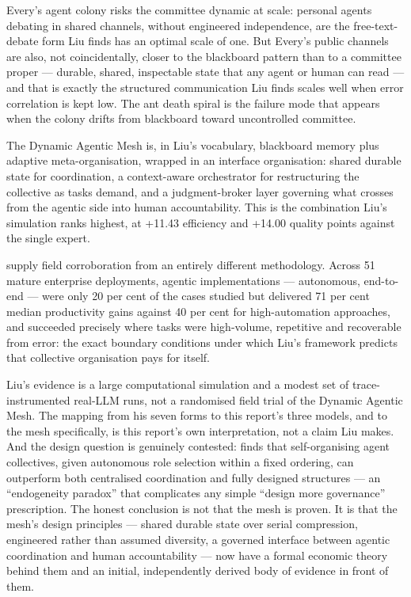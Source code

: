 Every's agent colony risks the committee dynamic at scale: personal agents debating in shared channels, without engineered independence, are the free-text-debate form Liu finds has an optimal scale of one. But Every's public channels are also, not coincidentally, closer to the blackboard pattern than to a committee proper --- durable, shared, inspectable state that any agent or human can read --- and that is exactly the structured communication Liu finds scales well when error correlation is kept low. The ant death spiral is the failure mode that appears when the colony drifts from blackboard toward uncontrolled committee.

The Dynamic Agentic Mesh is, in Liu's vocabulary, blackboard memory plus adaptive meta-organisation, wrapped in an interface organisation: shared durable state for coordination, a context-aware orchestrator for restructuring the collective as tasks demand, and a judgment-broker layer governing what crosses from the agentic side into human accountability. This is the combination Liu's simulation ranks highest, at +11.43 efficiency and +14.00 quality points against the single expert.

\textcite{Pereira2026Playbook} supply field corroboration from an entirely different methodology. Across 51 mature enterprise deployments, agentic implementations --- autonomous, end-to-end --- were only 20 per cent of the cases studied but delivered 71 per cent median productivity gains against 40 per cent for high-automation approaches, and succeeded precisely where tasks were high-volume, repetitive and recoverable from error: the exact boundary conditions under which Liu's framework predicts that collective organisation pays for itself.

\begin{cautionbox}
Liu's evidence is a large computational simulation and a modest set of trace-instrumented real-LLM runs, not a randomised field trial of the Dynamic Agentic Mesh. The mapping from his seven forms to this report's three models, and to the mesh specifically, is this report's own interpretation, not a claim Liu makes. And the design question is genuinely contested: \textcite{Dochkina2026} finds that self-organising agent collectives, given autonomous role selection within a fixed ordering, can outperform both centralised coordination and fully designed structures --- an ``endogeneity paradox'' that complicates any simple ``design more governance'' prescription. The honest conclusion is not that the mesh is proven. It is that the mesh's design principles --- shared durable state over serial compression, engineered rather than assumed diversity, a governed interface between agentic coordination and human accountability --- now have a formal economic theory behind them and an initial, independently derived body of evidence in front of them.
\end{cautionbox}
